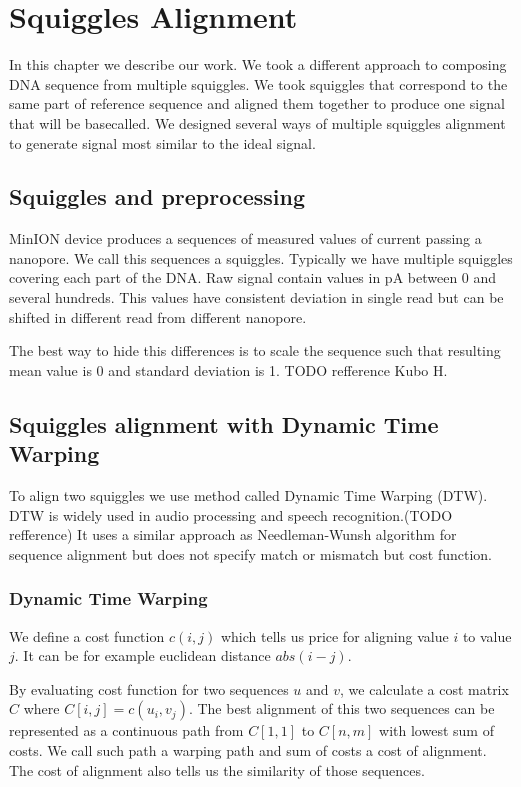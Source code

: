 \chapter{Squiggles Alignment}

\label{kap:squiggles} %

In this chapter we describe our work. We took a different approach to composing DNA sequence from multiple squiggles. 
We took squiggles that correspond to the same part of reference sequence and aligned them together to produce one signal 
that will be basecalled. We designed several ways of multiple squiggles alignment to generate signal most similar to the ideal signal.

\section{Squiggles and preprocessing}

MinION device produces a sequences of measured values of current passing a nanopore. We call this sequences a squiggles.
Typically we have multiple squiggles covering each part of the DNA. Raw signal contain values in pA between $0$ and several hundreds. 
This values have consistent deviation in single read but can be shifted in different read from different nanopore. 

The best way to hide this differences is to scale the sequence such that resulting mean value is 0 and standard deviation is 1.
TODO refference Kubo H.

\section{Squiggles alignment with Dynamic Time Warping}
To align two squiggles we use method called Dynamic Time Warping (DTW).
DTW is widely used in audio processing and speech recognition.(TODO refference)
It uses a similar approach as Needleman-Wunsh algorithm for sequence alignment but does not specify match or mismatch but cost function.

\subsection{Dynamic Time Warping}

We define a cost function $c(i,j)$ which tells us price for aligning value $i$ to value $j$. 
It can be for example euclidean distance $abs(i-j)$.

By evaluating cost function for two sequences $u$ and $v$, we calculate a cost matrix $C$ where $C[i,j] = c(u_i,v_j)$.
The best alignment of this two sequences can be represented as a continuous path from $C[1,1]$ to $C[n,m]$ with lowest sum of costs. 
We call such path a warping path and sum of costs a cost of alignment. The cost of alignment also tells us the similarity of those sequences.


